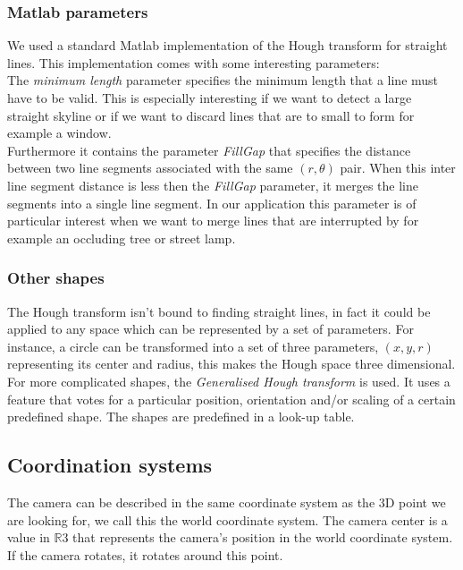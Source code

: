 \subsubsection{Matlab parameters}
We used a standard Matlab implementation of the Hough transform for straight lines.  This implementation comes with some interesting parameters:\\

	The \emph{minimum length} parameter specifies the minimum length that a line must have to be valid. This is especially interesting if we want to detect a large straight skyline or if we want to discard lines that are to small to form for example a window.\\

	Furthermore it contains the parameter \emph{FillGap} that specifies the distance
	between two line segments associated with the same $(r, \theta)$ pair.
	When this inter line segment distance is less then the \emph{FillGap} parameter, it merges the line segments into a single line segment. In our application this parameter is of particular interest when we want to merge lines that are interrupted by for example an occluding tree or street lamp.\\


\subsubsection{Other shapes}
The Hough transform isn't bound to finding straight lines, in fact it could be
applied to any space which can be represented by a set of parameters.  For
instance, a circle can be transformed into a set of three parameters, $(x,y,r)$
representing its center and radius, this makes the Hough space three
dimensional. 
For more complicated shapes, the 
\emph{Generalised Hough transform} is used.
It uses a feature that votes for a particular position, orientation and/or scaling of a certain predefined shape.  The shapes are predefined in a look-up table.



\subsection{Coordination systems}
The camera can be described in the same coordinate system as the 3D point we are
looking for, we call this the world coordinate system. 
The camera center is a value in $\mathbb{R}$3 that represents the camera's position in the world
coordinate system. If the camera rotates, it rotates around this point.


